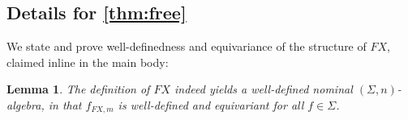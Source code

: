 \documentclass[11pt,a4paper]{amsart}
\newtheorem{lemma}[lemma]{Lemma}
\newcommand{\sig}{\Sigma}
\newcommand{\sigp}{\Sigma_0}
\newcommand{\sigf}{\Sigma_{\mathsf f}}
\newcommand{\sigb}{\Sigma_{\mathsf b}}
\theoremstyle{plain}
\numberwithin{equation}{section}
\newcommand{\+}[1]{\mathcal{#1}\xspace}
\theoremstyle{definition}
\begin{document}
\subsection*{Details for \cref{thm:free}}
We state and prove well-definedness and equivariance of the structure of $FX$, claimed inline in the main body:
\begin{lemma}\label{thm:freemodelisalgebra}
  The definition of \(FX\) indeed yields a well-defined nominal
  \((\sig, n)\)-algebra, in that \(f_{FX, m}\) is well-defined and equivariant for all \(f \in \sig\).
\end{lemma}
\end{document}

